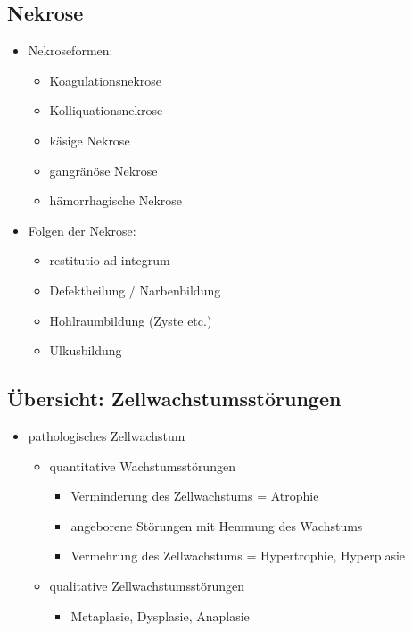 \subsection{Nekrose}
	\begin{itemize}
		\item Nekroseformen:
			\begin{itemize}
				\item Koagulationsnekrose
				\item Kolliquationsnekrose
				\item käsige Nekrose
				\item gangränöse Nekrose
				\item hämorrhagische Nekrose
			\end{itemize}
		\item Folgen der Nekrose:
			\begin{itemize}
				\item restitutio ad integrum
				\item Defektheilung / Narbenbildung
				\item Hohlraumbildung (Zyste etc.)
				\item Ulkusbildung
			\end{itemize}
	\end{itemize}

\subsection{Übersicht: Zellwachstumsstörungen}
	\begin{itemize}
		\item pathologisches Zellwachstum
			\begin{itemize}
				\item quantitative Wachstumsstörungen
					\begin{itemize}
						\item Verminderung des Zellwachstums = Atrophie
						\item angeborene Störungen mit Hemmung des Wachstums
						\item Vermehrung des Zellwachstums = Hypertrophie, Hyperplasie
					\end{itemize}
				\item qualitative Zellwachstumsstörungen
					\begin{itemize}
						\item Metaplasie, Dysplasie, Anaplasie
					\end{itemize}
			\end{itemize}
	\end{itemize}

